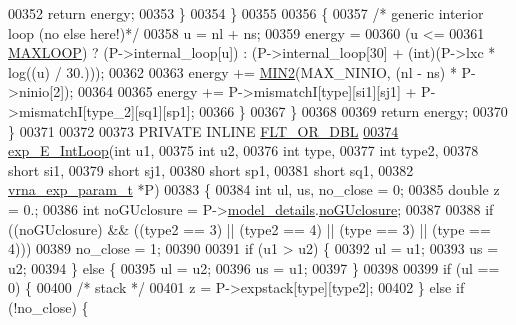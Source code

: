 \begin{DoxyCode}
00352         \textcolor{keywordflow}{return} energy;
00353       \}
00354     \}
00355 
00356     \{
00357       \textcolor{comment}{/* generic interior loop (no else here!)*/}
00358       u       = nl + ns;
00359       energy  =
00360         (u <=
00361          \hyperlink{energy__const_8h_ad1bd6eabac419670ddd3c9ed82145988}{MAXLOOP}) ? (P->internal\_loop[u]) : (P->internal\_loop[30] + (int)(P->lxc * log((u) / 30.)));
00362 
00363       energy += \hyperlink{group__utils_gae0b9cd0ce090bd69b951aa73e8fa4f7d}{MIN2}(MAX\_NINIO, (nl - ns) * P->ninio[2]);
00364 
00365       energy += P->mismatchI[type][si1][sj1] + P->mismatchI[type\_2][sq1][sp1];
00366     \}
00367   \}
00368 
00369   \textcolor{keywordflow}{return} energy;
00370 \}
00371 
00372 
00373 PRIVATE INLINE \hyperlink{group__data__structures_ga31125aeace516926bf7f251f759b6126}{FLT\_OR\_DBL}
\hyperlink{group__loops_ga95de54d8a2a17645a95e0f34e189d9c9}{00374} \hyperlink{group__loops_ga95de54d8a2a17645a95e0f34e189d9c9}{exp\_E\_IntLoop}(\textcolor{keywordtype}{int}               u1,
00375               \textcolor{keywordtype}{int}               u2,
00376               \textcolor{keywordtype}{int}               type,
00377               \textcolor{keywordtype}{int}               type2,
00378               \textcolor{keywordtype}{short}             si1,
00379               \textcolor{keywordtype}{short}             sj1,
00380               \textcolor{keywordtype}{short}             sp1,
00381               \textcolor{keywordtype}{short}             sq1,
00382               \hyperlink{group__energy__parameters_structvrna__exp__param__s}{vrna\_exp\_param\_t}  *P)
00383 \{
00384   \textcolor{keywordtype}{int}     ul, us, no\_close = 0;
00385   \textcolor{keywordtype}{double}  z           = 0.;
00386   \textcolor{keywordtype}{int}     noGUclosure = P->\hyperlink{group__energy__parameters_ac18055127bccc27c1223f1d2f3b01b53}{model\_details}.\hyperlink{group__model__details_a7e883db1f33f8f3baa5c9b140350c78e}{noGUclosure};
00387 
00388   \textcolor{keywordflow}{if} ((noGUclosure) && ((type2 == 3) || (type2 == 4) || (type == 3) || (type == 4)))
00389     no\_close = 1;
00390 
00391   \textcolor{keywordflow}{if} (u1 > u2) \{
00392     ul  = u1;
00393     us  = u2;
00394   \} \textcolor{keywordflow}{else} \{
00395     ul  = u2;
00396     us  = u1;
00397   \}
00398 
00399   \textcolor{keywordflow}{if} (ul == 0) \{
00400     \textcolor{comment}{/* stack */}
00401     z = P->expstack[type][type2];
00402   \} \textcolor{keywordflow}{else} \textcolor{keywordflow}{if} (!no\_close) \{

\end{DoxyCode}
